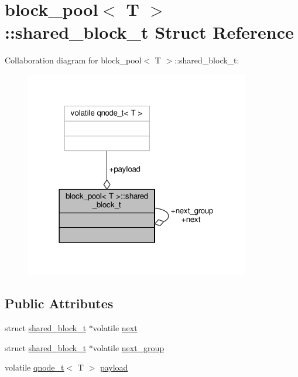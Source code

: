 \hypertarget{structblock__pool_1_1shared__block__t}{\section{block\-\_\-pool$<$ T $>$\-:\-:shared\-\_\-block\-\_\-t Struct Reference}
\label{structblock__pool_1_1shared__block__t}
}


Collaboration diagram for block\-\_\-pool$<$ T $>$\-:\-:shared\-\_\-block\-\_\-t\-:
\nopagebreak
\begin{figure}[H]
\begin{center}
\leavevmode
\includegraphics[width=278pt]{structblock__pool_1_1shared__block__t__coll__graph}
\end{center}
\end{figure}
\subsection*{Public Attributes}
\begin{DoxyCompactItemize}
\item 
struct \hyperlink{structblock__pool_1_1shared__block__t}{shared\-\_\-block\-\_\-t} $\ast$volatile \hyperlink{structblock__pool_1_1shared__block__t_a84b5be10002aa5754c310fa94ba78b0d}{next}
\item 
struct \hyperlink{structblock__pool_1_1shared__block__t}{shared\-\_\-block\-\_\-t} $\ast$volatile \hyperlink{structblock__pool_1_1shared__block__t_adfa175667fb6e70b9894a3a6977feeda}{next\-\_\-group}
\item 
volatile \hyperlink{structqnode__t}{qnode\-\_\-t}$<$ T $>$ \hyperlink{structblock__pool_1_1shared__block__t_a88fd202f24790923340bd33d7ab690db}{payload}
\end{DoxyCompactItemize}


